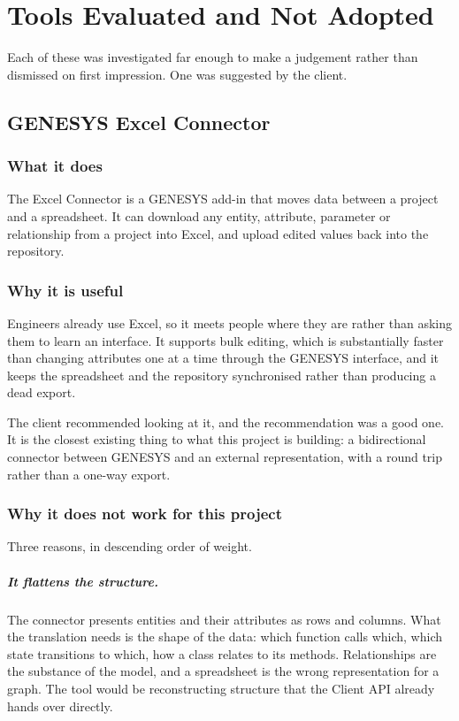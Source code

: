 \chapter{Tools Evaluated and Not Adopted}
\label{ch:rejected}

Each of these was investigated far enough to make a judgement rather than
dismissed on first impression. One was suggested by the client.

\section{GENESYS Excel Connector}
\label{sec:excel}

\subsection{What it does}

The Excel Connector is a GENESYS add-in that moves data between a project and a
spreadsheet. It can download any entity, attribute, parameter or relationship
from a project into Excel, and upload edited values back into the repository.

\subsection{Why it is useful}

Engineers already use Excel, so it meets people where they are rather than asking
them to learn an interface. It supports bulk editing, which is substantially
faster than changing attributes one at a time through the GENESYS interface, and
it keeps the spreadsheet and the repository synchronised rather than producing a
dead export.

The client recommended looking at it, and the recommendation was a good one. It
is the closest existing thing to what this project is building: a bidirectional
connector between GENESYS and an external representation, with a round trip
rather than a one-way export.

\subsection{Why it does not work for this project}

Three reasons, in descending order of weight.

\paragraph{It flattens the structure.}
The connector presents entities and their attributes as rows and columns. What
the translation needs is the shape of the data: which function calls which, which
state transitions to which, how a class relates to its methods. Relationships are
the substance of the model, and a spreadsheet is the wrong representation for a
graph. The tool would be reconstructing structure that the Client API already
hands over directly.

